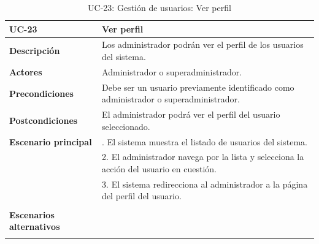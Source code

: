 \begin{table}
  \begin{center}
    \begin{tabularx}{16.4cm}{|l|X|}
      \hline
      \textbf{UC-23} & \textbf{Ver perfil}\\
      \hline
      \textbf{Descripción} & Los administrador podrán ver el perfil de los usuarios del sistema.\\
      \hline
      \textbf{Actores} & Administrador o superadministrador.\\
      \hline
      \textbf{Precondiciones} & Debe ser un usuario previamente identificado como administrador o superadministrador.\\
      \hline
      \textbf{Postcondiciones} & El administrador podrá ver el perfil del usuario seleccionado.\\
      \hline
      \textbf{Escenario principal} & \smallskip 1. El sistema muestra el listado de usuarios del sistema.\\
      & 2. El administrador navega por la lista y selecciona la acción del usuario en cuestión.\\
      & 3. El sistema redirecciona al administrador a la página del perfil del usuario.\\
      & \\
      \hline
      \textbf{Escenarios alternativos} & \\
      & \\
      \hline
    \end{tabularx}
    \caption{UC-23: Gestión de usuarios: Ver perfil}
    \label{tab:CU-ver-perfil-admin}
  \end{center}
\end{table}


